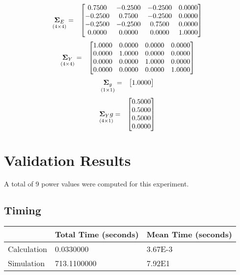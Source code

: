 \documentclass{glimmpse-report}
\begin{document}
\begin{eqnarray*}
\underset{\left(4\times4\right)}{\mathbf{\Sigma}_E} & = & \begin{bmatrix}0.7500 & -0.2500 & -0.2500 & 0.0000\protect\\
-0.2500 & 0.7500 & -0.2500 & 0.0000\protect\\
-0.2500 & -0.2500 & 0.7500 & 0.0000\protect\\
0.0000 & 0.0000 & 0.0000 & 1.0000\protect\\
\end{bmatrix}
\end{eqnarray*}
\begin{eqnarray*}
\underset{\left(4\times4\right)}{\mathbf{\Sigma}_Y} & = & \begin{bmatrix}1.0000 & 0.0000 & 0.0000 & 0.0000\protect\\
0.0000 & 1.0000 & 0.0000 & 0.0000\protect\\
0.0000 & 0.0000 & 1.0000 & 0.0000\protect\\
0.0000 & 0.0000 & 0.0000 & 1.0000\protect\\
\end{bmatrix}
\end{eqnarray*}
\begin{eqnarray*}
\underset{\left(1\times1\right)}{\mathbf{\Sigma}_g} & = & \begin{bmatrix}1.0000\protect\\
\end{bmatrix}
\end{eqnarray*}
\begin{eqnarray*}
\underset{\left(4\times1\right)}{\mathbf{\Sigma}_Yg} & = & \begin{bmatrix}0.5000\protect\\
0.5000\protect\\
0.5000\protect\\
0.0000\protect\\
\end{bmatrix}
\end{eqnarray*}
\section{Validation Results}
A total of 9 power values were computed for this experiment.

\subsection{Timing}
\begin{tabular}{|l|l|l|}
\hline
 & Total Time (seconds) & Mean Time (seconds) \\ 
\hline
Calculation & 0.0330000 & 3.67E-3\tabularnewline
\hline
Simulation & 713.1100000 & 7.92E1\tabularnewline
\hline
\end{tabular}
\end{document}
